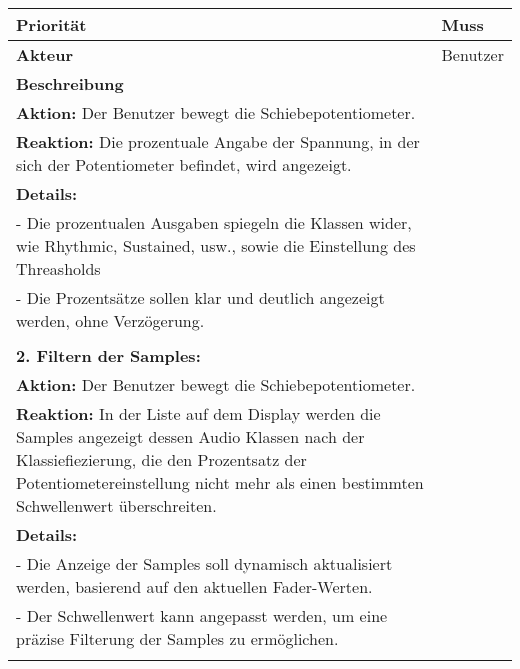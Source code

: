\begin{longtable}[c]{|p{3cm}|p{13cm}|}
	\hline
	\textbf{Priorität} & Muss \\
	\hline
	\textbf{Akteur} & Benutzer \\
	\hline
	\textbf{Beschreibung} & 
	\begin{tabularx}{13cm}{X}
		\textbf{1. Anzeige der Fader-Werte:} \\
		\textbf{Aktion:} Der Benutzer bewegt die Schiebepotentiometer. \\
		\textbf{Reaktion:} Die prozentuale Angabe der Spannung, in der sich der Potentiometer befindet, wird angezeigt. \\
		\textbf{Details:} \\
		- Die prozentualen Ausgaben spiegeln die Klassen wider, wie Rhythmic, Sustained, usw., sowie die Einstellung des Threasholds \\
		- Die Prozentsätze sollen klar und deutlich angezeigt werden, ohne Verzögerung. \\
		\\
		\textbf{2. Filtern der Samples:} \\
		\textbf{Aktion:} Der Benutzer bewegt die Schiebepotentiometer. \\
		\textbf{Reaktion:} In der Liste auf dem Display werden die Samples angezeigt dessen Audio Klassen nach der Klassiefiezierung, die den Prozentsatz der Potentiometereinstellung nicht mehr als einen bestimmten Schwellenwert überschreiten. \\
		\textbf{Details:} \\
		- Die Anzeige der Samples soll dynamisch aktualisiert werden, basierend auf den aktuellen Fader-Werten. \\
		- Der Schwellenwert kann angepasst werden, um eine präzise Filterung der Samples zu ermöglichen. \\
	\end{tabularx} \\
	\hline
\end{longtable}
